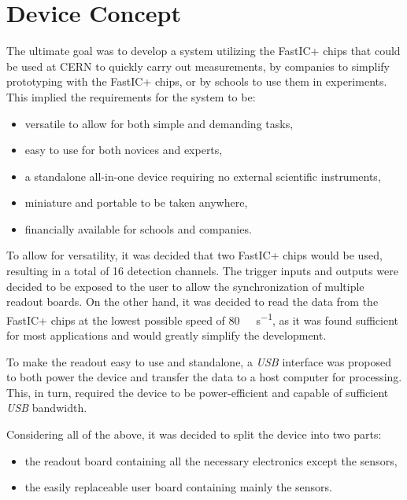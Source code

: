 \chapter{Device Concept}
The ultimate goal was to develop a system utilizing the FastIC+ chips that could be used at CERN to quickly carry out measurements, by companies to simplify prototyping with the FastIC+ chips, or by schools to use them in experiments. This implied the requirements for the system to be:
\begin{itemize}
    \item versatile to allow for both simple and demanding tasks,
    \item easy to use for both novices and experts,
    \item a standalone all-in-one device requiring no external scientific instruments,
    \item miniature and portable to be taken anywhere,
    \item financially available for schools and companies.
\end{itemize}

To allow for versatility, it was decided that two FastIC+ chips would be used, resulting in a total of 16 detection channels. The trigger inputs and outputs were decided to be exposed to the user to allow the synchronization of multiple readout boards. On the other hand, it was decided to read the data from the FastIC+ chips at the lowest possible speed of \SI{80}{\mega\bit\per\second}, as it was found sufficient for most applications and would greatly simplify the development.

To make the readout easy to use and standalone, a \emph{USB} interface was proposed to both power the device and transfer the data to a host computer for processing. This, in turn, required the device to be power-efficient and capable of sufficient \emph{USB} bandwidth.

Considering all of the above, it was decided to split the device into two parts: 
\begin{itemize}
    \item the readout board containing all the necessary electronics except the sensors,
    \item the easily replaceable user board containing mainly the sensors.
\end{itemize}

